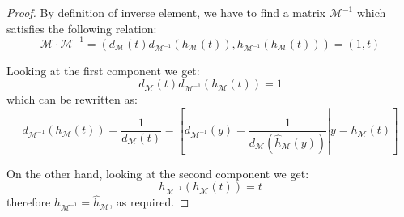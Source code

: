 \begin{proof}
    By definition of inverse element, 
    we have to find a matrix $\mathcal{M}^{-1}$ which satisfies the following relation:
    \begin{displaymath}
        \mathcal{M}\cdot\mathcal{M}^{-1}
            =\left(d_{\mathcal{M}}(t)d_{\mathcal{M}^{-1}}(h_{\mathcal{M}}(t)),
                    h_{\mathcal{M}^{-1}}(h_{\mathcal{M}}(t))\right)
            =\left(1,t\right)
    \end{displaymath}

    Looking at the first component we get:
    \begin{displaymath}
        d_{\mathcal{M}}(t)d_{\mathcal{M}^{-1}}(h_{\mathcal{M}}(t))=1    
    \end{displaymath}
    which can be rewritten as:
    \begin{displaymath}
        d_{\mathcal{M}^{-1}}(h_{\mathcal{M}}(t))=\frac{1}{d_{\mathcal{M}}(t)}    
            = \left.\left[
                d_{\mathcal{M}^{-1}}(y)=\frac{1}{d_{\mathcal{M}}(\hat{h}_{\mathcal{M}}(y))}
                    \right|y=h_{\mathcal{M}}(t)
                \right]
    \end{displaymath}

    On the other hand, looking at the second component we get:
    \begin{displaymath}
        h_{\mathcal{M}^{-1}}(h_{\mathcal{M}}(t))=t
    \end{displaymath}
    therefore $h_{\mathcal{M}^{-1}}=\hat{h}_{\mathcal{M}}$, as required.
\end{proof}


